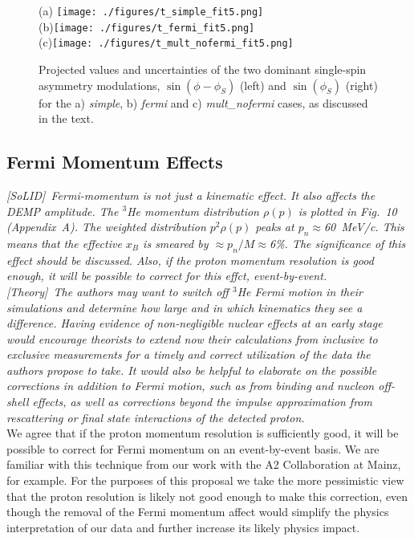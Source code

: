 \begin{figure}[hbt!]
\begin{center}
(a) \texttt{[image: ./figures/t\_simple\_fit5.png]}\\
(b)\texttt{[image: ./figures/t\_fermi\_fit5.png]}\\
(c)\texttt{[image: ./figures/t\_mult\_nofermi\_fit5.png]}\\
\end{center}
\caption{\label{fig:asym_nofermi}{Projected values and uncertainties of the two
    dominant single-spin asymmetry modulations, $\sin(\phi-\phi_S)$ (left) and
    $\sin(\phi_S)$ (right) for the a) {\it simple}, b) {\it fermi} and c) {\it
      mult\_nofermi} cases, as discussed in the text.}}
\end{figure}

\subsection{Fermi Momentum Effects
\label{sec:resp_fermi}}

{\it [SoLID]\ Fermi-momentum is not just a kinematic effect.  It also affects
  the DEMP amplitude.  The $^3$He momentum distribution $\rho(p)$ is plotted in
  Fig.~10 (Appendix~A).  The weighted distribution $p^2\rho(p)$ peaks at
  $p_n\approx$60~MeV/c.  This means that the effective $x_B$ is smeared by
  $\approx p_n/M\approx$6\%.  The significance of this effect should be
  discussed.  Also, if the proton momentum resolution is good enough, it will
  be possible to correct for this effct, event-by-event.}\\[0.2ex]

{\it [Theory]\ The authors may want to switch off $^3$He Fermi motion in their
  simulations and determine how large and in which kinematics they see a
  difference.  Having evidence of non-negligible nuclear effects at an early
  stage would encourage theorists to extend now their calculations from
  inclusive to exclusive measurements for a timely and correct utilization of
  the data the authors propose to take.  It would also be helpful to elaborate
  on the possible corrections in addition to Fermi motion, such as from binding
  and nucleon off-shell effects, as well as corrections beyond the impulse
  approximation from rescattering or final state interactions of the detected
  proton.}\\[0.2ex]

We agree that if the proton momentum resolution is sufficiently good, it will
be possible to correct for Fermi momentum on an event-by-event basis.  We are
familiar with this technique from our work with the A2 Collaboration at Mainz,
for example.  For the purposes of this proposal we take the more pessimistic
view that the proton resolution is likely not good enough to make this
correction, even though the removal of the Fermi momentum affect would simplify
the physics interpretation of our data and further increase its likely physics
impact.

